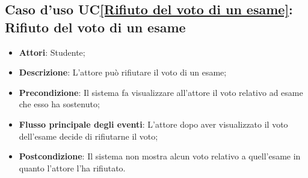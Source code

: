 \subsection{Caso d'uso UC\ref{Rifiuto del voto di un esame}: Rifiuto del voto di un esame}
\begin{itemize}
	\item \textbf{Attori}: Studente;
	\item \textbf{Descrizione}: L'attore può rifiutare il voto di un esame;
	\item \textbf{Precondizione}: Il sistema fa visualizzare all'attore il voto relativo ad esame che esso ha sostenuto;
	\item \textbf{Flusso principale degli eventi}: L'attore dopo aver visualizzato il voto dell'esame decide di rifiutarne il voto;
	\item \textbf{Postcondizione}: Il sistema non mostra alcun voto relativo a quell'esame in quanto l'attore l'ha rifiutato.
\end{itemize}

